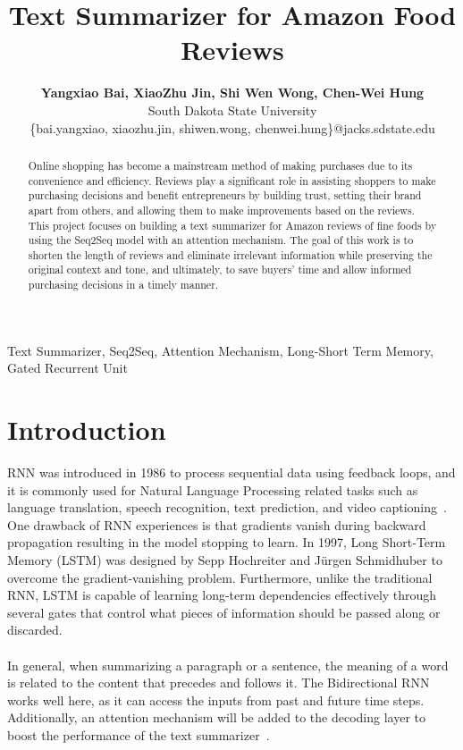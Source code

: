 \documentclass[conference]{IEEEtran}
\begin{document}
\title{\textbf{Text Summarizer for Amazon Food Reviews}\\}
\author{\textbf{\Large{Yangxiao Bai, XiaoZhu Jin, Shi Wen Wong, Chen-Wei Hung}} \\
South Dakota State University \\
\{bai.yangxiao,  xiaozhu.jin, shiwen.wong, chenwei.hung\}@jacks.sdstate.edu \\
}

\maketitle

\begin{abstract}
Online shopping has become a mainstream method of making purchases due to its convenience and efficiency. Reviews play a significant role in assisting shoppers to make purchasing decisions and benefit entrepreneurs by building trust, setting their brand apart from others, and allowing them to make improvements based on the reviews. This project focuses on building a text summarizer for Amazon reviews of fine foods by using the Seq2Seq model with an attention mechanism. The goal of this work is to shorten the length of reviews and eliminate irrelevant information while preserving the original context and tone, and ultimately, to save buyers’ time and allow informed purchasing decisions in a timely manner. 
\end{abstract} 

\begin{IEEEkeywords}
Text Summarizer, Seq2Seq, Attention Mechanism, Long-Short Term Memory, Gated Recurrent Unit
\end{IEEEkeywords}

\section{Introduction}
RNN was introduced in 1986 to process sequential data using feedback loops, and it is commonly used for Natural Language Processing related tasks such as language translation, speech recognition, text prediction, and video captioning~\cite{staudemeyer2019understanding}. One drawback of RNN experiences is that gradients vanish during backward propagation resulting in the model stopping to learn. In 1997, Long Short-Term Memory (LSTM) was designed by Sepp Hochreiter and J\"{u}rgen Schmidhuber to overcome the gradient-vanishing problem. Furthermore, unlike the traditional RNN, LSTM is capable of learning long-term dependencies effectively through several gates that control what pieces of information should be passed along or discarded. \\ \\
\indent In general, when summarizing a paragraph or a sentence, the meaning of a word is related to the content that precedes and follows it. The Bidirectional RNN works well here, as it can access the inputs from past and future time steps. Additionally, an attention mechanism will be added to the decoding layer to boost the performance of the text summarizer~\cite{vaswani2017attention}. 
\end{document}
